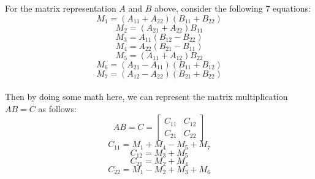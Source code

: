 \documentclass{article}
\begin{document}
For the matrix representation $A$ and $B$ above, consider the following 7 equations:
\begin{equation}
    M_1 = (A_{11} + A_{22})(B_{11} + B_{22})
\end{equation}
\begin{equation}
    M_2 = (A_{21} + A_{22})B_{11}
\end{equation}
\begin{equation}
    M_3 = A_{11}(B_{12} - B_{22})
\end{equation}
\begin{equation}
    M_4 = A_{22}(B_{21} - B_{11})
\end{equation}
\begin{equation}
    M_5 = (A_{11} + A_{12})B_{22}
\end{equation}
\begin{equation}
    M_6 = (A_{21} - A_{11})(B_{11} + B_{12})
\end{equation}
\begin{equation}
    M_7 = (A_{12} - A_{22})(B_{21} + B_{22})
\end{equation}\\
Then by doing some math here, we can represent the matrix multiplication $AB = C$ as follows:
\begin{equation}
    AB = C = \begin{bmatrix}
        C_{11} & C_{12} \\
        C_{21} & C_{22}
    \end{bmatrix}
\end{equation}
\begin{equation}
    C_{11} = M_1 + M_4 - M_5 + M_7
\end{equation}
\begin{equation}
    C_{12} = M_3 + M_5
\end{equation}
\begin{equation}
    C_{21} = M_2 + M_4
\end{equation}
\begin{equation}
    C_{22} = M_1 - M_2 + M_3 + M_6
\end{equation}
\end{document}
